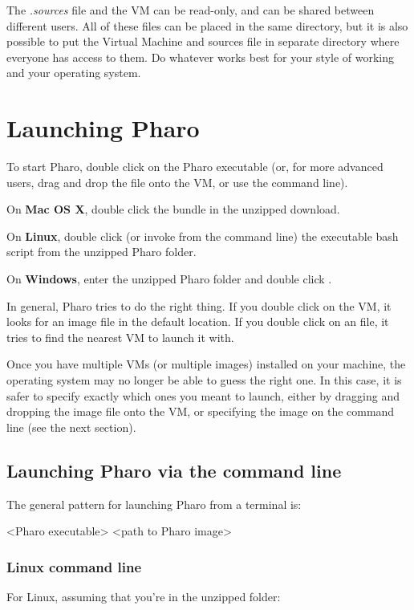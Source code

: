 \documentclass[a4paper,10pt,twoside]{book}
\begin{document}
The \textit{.sources} file and the VM can be read-only, and can be shared between
different users. All of these files can be placed in the same directory, but it
is also possible to put the Virtual Machine and sources file in separate
directory where everyone has access to them. Do whatever works best for your
style of working and your operating system.
\section{Launching Pharo}
To start Pharo, double click on the Pharo executable (or, for more advanced
users, drag and drop the  file onto the VM, or use the command line).

On \textbf{Mac OS X}, double click the  bundle in the unzipped download.

On \textbf{Linux}, double click (or invoke from the command line) the 
executable bash script from the unzipped Pharo folder.

On \textbf{Windows}, enter the unzipped Pharo folder and double click .

In general, Pharo tries to do the right thing. If you double click on the VM,
it looks for an image file in the default location. If you double click on an
 file, it tries to find the nearest VM to launch it with.

Once you have multiple VMs (or multiple images) installed on your
machine, the operating system may no longer be able to guess the right one. In this
case, it is safer to specify exactly which ones you meant to launch, either
by dragging and dropping the image file onto the VM, or specifying the image on
the command line (see the next section).
\subsection{Launching Pharo via the command line}
The general pattern for launching Pharo from a terminal is:


\begin{code}{}
<Pharo executable> <path to Pharo image>
\end{code}

\subsubsection{Linux command line}
For Linux, assuming that you're in the unzipped  folder:
\end{document}
